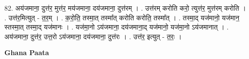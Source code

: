 \documentclass[17pt]{extarticle}
\begin{document}
82. अय॑जमाना॒ दुत्त॑र॒ मुत्त॑र॒ मय॑जमाना॒ दय॑जमाना॒ दुत्त॑रम् । . उत्त॑रम् करोति करो॒ त्युत्त॑र॒ मुत्त॑रम् करोति । . उत्त॑र॒मित्युत् - त॒र॒म् । . क॒रो॒ति॒ तस्मा॒त् तस्मा᳚त् करोति करोति॒ तस्मा᳚त् । . तस्मा॒द् यज॑मानो॒ यज॑मान॒ स्तस्मा॒त् तस्मा॒द् यज॑मानः । . यज॑मा॒नो ऽय॑जमाना॒ दय॑जमाना॒द् यज॑मानो॒ यज॑मा॒नो ऽय॑जमानात् । . अय॑जमाना॒ दुत्त॑र॒ उत्त॒रो ऽय॑जमाना॒ दय॑जमाना॒ दुत्त॑रः । . उत्त॑र॒ इत्युत् - त॒रः॒ । \newline

\textbf{Ghana Paata } \newline
\end{document}
